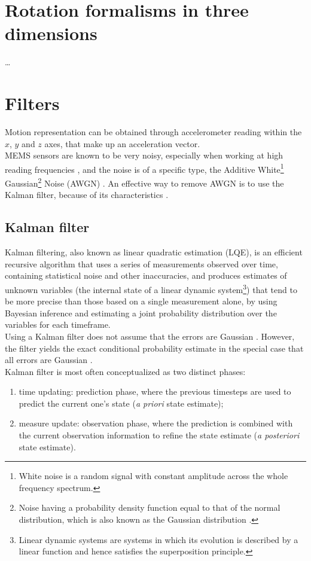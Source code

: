 \section{Rotation formalisms in three dimensions}
\dots

\section{Filters}
Motion representation can be obtained through accelerometer reading within the $x$, $y$ and $z$ axes, that make up an acceleration vector.\\
MEMS sensors are known to be very noisy, especially when working at high reading frequencies \cite[7]{Mat08}, and the noise is of a specific type, the Additive White\footnote{White noise is a random signal with constant amplitude across the whole frequency spectrum.} Gaussian\footnote{Noise having a probability density function equal to that of the normal distribution, which is also known as the Gaussian distribution \cite{WikipediaGaussianNoise}.} Noise (AWGN) \cite{Yas03}. An effective way to remove AWGN is to use the Kalman filter, because of its characteristics \cite{Ko07, Sär15}.

\subsection{Kalman filter}
Kalman filtering, also known as linear quadratic estimation (LQE), is an efficient recursive algorithm that uses a series of measurements observed over time, containing statistical noise and other inaccuracies, and produces estimates of unknown variables (the internal state of a linear dynamic system\footnote{Linear dynamic systems are systems in which its evolution is described by a linear function and hence satisfies the superposition principle.}) that tend to be more precise than those based on a single measurement alone, by using Bayesian inference and estimating a joint probability distribution over the variables for each timeframe.\\
Using a Kalman filter does not assume that the errors are Gaussian \cite{Kal60}. However, the filter yields the exact conditional probability estimate in the special case that all errors are Gaussian \cite{WikipediaKalman}.\\
Kalman filter is most often conceptualized as two distinct phases:

\begin{enumerate}
	\item time updating: prediction phase, where the previous timesteps are used to predict the current one's state (\textit{a priori} state estimate);
	\item measure update: observation phase, where the prediction is combined with the current observation information to refine the state estimate (\textit{a posteriori} state estimate).
\end{enumerate}

